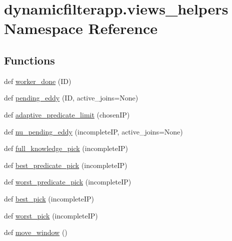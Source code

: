 \hypertarget{namespacedynamicfilterapp_1_1views__helpers}{}\section{dynamicfilterapp.\+views\+\_\+helpers Namespace Reference}
\label{namespacedynamicfilterapp_1_1views__helpers}
\subsection*{Functions}
\begin{DoxyCompactItemize}
\item 
def \mbox{\hyperlink{namespacedynamicfilterapp_1_1views__helpers_af27860dfe5bfa6b2b8a1b29347eb918d}{worker\+\_\+done}} (ID)
\item 
def \mbox{\hyperlink{namespacedynamicfilterapp_1_1views__helpers_ad11bcb9737901ab723493b4f7fe09329}{pending\+\_\+eddy}} (ID, active\+\_\+joins=None)
\item 
def \mbox{\hyperlink{namespacedynamicfilterapp_1_1views__helpers_ac0d019064d0a4dff3cd08f7ea4c4d560}{adaptive\+\_\+predicate\+\_\+limit}} (chosen\+IP)
\item 
def \mbox{\hyperlink{namespacedynamicfilterapp_1_1views__helpers_a0166128faa543e6b533e3fc103de243b}{nu\+\_\+pending\+\_\+eddy}} (incomplete\+IP, active\+\_\+joins=None)
\item 
def \mbox{\hyperlink{namespacedynamicfilterapp_1_1views__helpers_a19a0b5e8e5ce5def8165fcd0558ca88d}{full\+\_\+knowledge\+\_\+pick}} (incomplete\+IP)
\item 
def \mbox{\hyperlink{namespacedynamicfilterapp_1_1views__helpers_a6f82774700f533bb63a288a3949ee0d8}{best\+\_\+predicate\+\_\+pick}} (incomplete\+IP)
\item 
def \mbox{\hyperlink{namespacedynamicfilterapp_1_1views__helpers_a0fc083f3d6a368a4f543011330fff151}{worst\+\_\+predicate\+\_\+pick}} (incomplete\+IP)
\item 
def \mbox{\hyperlink{namespacedynamicfilterapp_1_1views__helpers_a31c7bc791ed2c2c02c139599e02990ed}{best\+\_\+pick}} (incomplete\+IP)
\item 
def \mbox{\hyperlink{namespacedynamicfilterapp_1_1views__helpers_a9b2092a89d40943b1572b5c8fb873d86}{worst\+\_\+pick}} (incomplete\+IP)
\item 
def \mbox{\hyperlink{namespacedynamicfilterapp_1_1views__helpers_aa0f3d2407bfd2bfc1074a0fb2f82a336}{move\+\_\+window}} ()
\item 

\end{DoxyCompactItemize}
